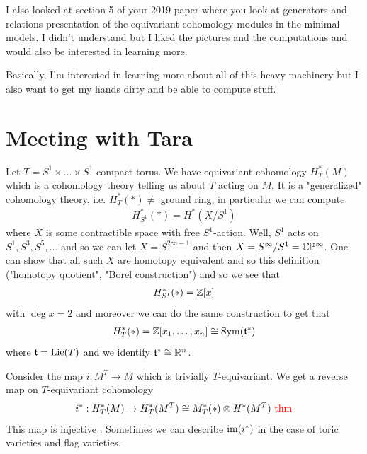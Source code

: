 \documentclass[12pt]{article}
\begin{document}
I also looked at section 5 of your 2019 paper where you look at generators and relations presentation of the equivariant cohomology modules in the minimal models. I didn't understand but I liked the pictures and the computations and would also be interested in learning more.

Basically, I'm interested in learning more about all of this heavy machinery but I also want to get my hands dirty and be able to compute stuff. 

\section{Meeting with Tara}
Let $T = S^1\times \dots \times S^1$ compact torus. We have equivariant cohomology $H^*_T(M)$ which is a cohomology theory telling us about $T$ acting on $M$. It is a "generalized" cohomology theory, i.e. $H_T^*(*) \neq $ ground ring, in particular we can compute \begin{align*}
    H^*_{S^1}(*) = H^*(X/S^1)
\end{align*} where $X$ is some contractible space with free $S^1$-action. Well, $S^1$ acts on $S^1,S^3,S^5,\dots$ and so we can let $X = S^{2\infty -1}$ and then $X = S^\infty/ S^1 = \mathbb{C}\mathbb{P}^\infty$. One can show that all such $X$ are homotopy equivalent and so this definition ("homotopy quotient", "Borel construction") and so we see that \begin{align*}
    H^*_{S^1}(*) = \mathbb{Z}[x]
\end{align*} with $\deg x = 2$ and moreover we can do the same construction to get that \begin{align*}
    H^*_{T}(*) = \mathbb{Z}[x_1,\dots,x_n] \cong \operatorname{Sym}(\mathfrak{t}^*)
\end{align*} where $\mathfrak{t} = \operatorname{Lie}(T)$ and we identify $\mathfrak{t}^*\cong\mathbb{R}^n$. 

\hfill

Consider the map $i:M^T\to M$ which is trivially $T$-equivariant. We get a reverse map on $T$-equivariant cohomology \begin{align*}
    i^*:H^*_T(M) \to H_T^*(M^T) \cong M^*_T(*)\otimes H^*(M^T) \text{ \textcolor{red}{{thm}}}
\end{align*} This map is injective . Sometimes we can describe $\operatorname{im}(i^*)$ in the case of toric varieties and flag varieties.  

\hfill
\end{document}
